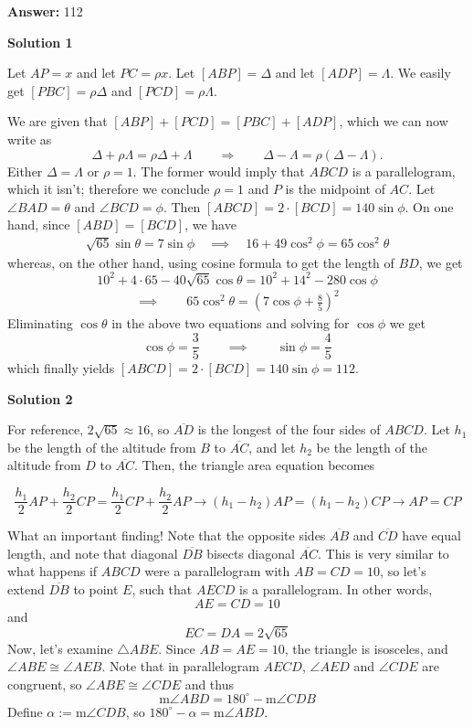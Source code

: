 \begin{enumerate}
 
 \textbf{Answer: }112



\textbf{Solution 1}

Let $AP=x$ and let $PC=\rho x$. Let $[ABP]=\Delta$ and let $[ADP]=\Lambda$. We easily get $[PBC]=\rho \Delta$ and $[PCD]=\rho\Lambda$. 

 We are given that $[ABP] +[PCD] = [PBC]+[ADP]$, which we can now write as 
 \[\Delta + \rho\Lambda = \rho\Delta + \Lambda \qquad \Longrightarrow \qquad \Delta -\Lambda = \rho (\Delta -\Lambda).\] Either $\Delta = \Lambda$ or $\rho=1$. The former would imply that $ABCD$ is a parallelogram, which it isn't; therefore we conclude $\rho=1$ and $P$ is the midpoint of $AC$. Let $\angle BAD = \theta$ and $\angle BCD = \phi$. Then $[ABCD]=2\cdot [BCD]=140\sin\phi$. On one hand, since $[ABD]=[BCD]$, we have 
 \begin{align}\sqrt{65}\sin\theta = 7\sin\phi \quad \implies \quad 16+49\cos^2\phi = 65\cos^2\theta\end{align}whereas, on the other hand, using cosine formula to get the length of $BD$, we get 
 \[10^2+4\cdot 65 - 40\sqrt{65}\cos\theta = 10^2+14^2-280\cos\phi\]
 \begin{align}\tag{2}\implies \qquad  65\cos^2\theta = \left(7\cos\phi+ \frac{8}{5}\right)^2\end{align}Eliminating $\cos\theta$ in the above two equations and solving for $\cos\phi$ we get
 \[\cos\phi = \frac{3}{5}\qquad \implies \qquad \sin\phi = \frac{4}{5}\]which finally yields $[ABCD]=2\cdot [BCD] = 140\sin\phi = 112$.

 



\textbf{Solution 2}

For reference, $2\sqrt{65} \approx 16$, so $\overline{AD}$ is the longest of the four sides of $ABCD$. Let $h_1$ be the length of the altitude from $B$ to $\overline{AC}$, and let $h_2$ be the length of the altitude from $D$ to $\overline{AC}$. Then, the triangle area equation becomes

 
 \[\frac{h_1}{2}AP + \frac{h_2}{2}CP = \frac{h_1}{2}CP + \frac{h_2}{2}AP \rightarrow \left(h_1 - h_2\right)AP = \left(h_1 - h_2\right)CP \rightarrow AP = CP\]

 What an important finding! Note that the opposite sides $\overline{AB}$ and $\overline{CD}$ have equal length, and note that diagonal $\overline{DB}$ bisects diagonal $\overline{AC}$. This is very similar to what happens if $ABCD$ were a parallelogram with $AB = CD = 10$, so let's extend $\overline{DB}$ to point $E$, such that $AECD$ is a parallelogram. In other words, 
 \[AE = CD = 10\] and 
 \[EC = DA = 2\sqrt{65}\] Now, let's examine $\triangle ABE$. Since $AB = AE = 10$, the triangle is isosceles, and $\angle ABE \cong \angle AEB$. Note that in parallelogram $AECD$, $\angle AED$ and $\angle CDE$ are congruent, so $\angle ABE \cong \angle CDE$ and thus 
 \[\text{m}\angle ABD = 180^\circ - \text{m}\angle CDB\] Define $\alpha := \text{m}\angle CDB$, so $180^\circ - \alpha = \text{m}\angle ABD$. 


\end{enumerate}
